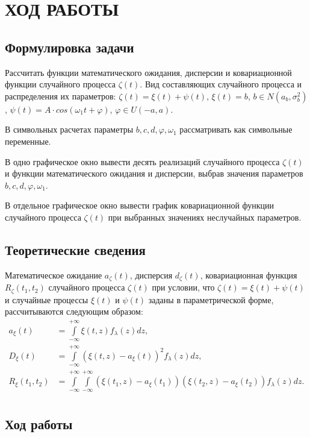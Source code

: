 \section{ХОД РАБОТЫ}

\subsection{Формулировка задачи}

Рассчитать функции математического ожидания, дисперсии и ковариационной функции
случайного процесса $ \zeta(t) $. Вид составляющих случайного процесса
и распределения их параметров:
$ \zeta(t)= \xi(t) + \psi(t) $,
$ \xi(t) = b $,
$ b \in N(a_b, \sigma^2_b) $,
$ \psi(t) = A \cdot cos(\omega_1 t + \varphi) $,
$ \varphi \in U(-a,a)$.

В символьных расчетах параметры $ b, c, d,
\varphi, \omega_1 $ рассматривать как символьные переменные.

В одно графическое окно вывести десять реализаций случайного процесса $ \zeta(t) $
и функции математического ожидания и дисперсии, выбрав значения
параметров $ b, c, d, \varphi, \omega_1 $.

В отдельное графическое окно вывести график ковариационной функции
случайного процесса $ \zeta(t) $ при выбранных значениях неслучайных параметров.


\subsection{Теоретические сведения}

Математическое ожидание $ a_{\zeta} (t) $, дисперсия $ d_{\zeta} (t) $,
ковариационная функция $ R_{\zeta} (t_1, t_2) $ случайного процесса $ \zeta(t) $
при условии, что $ \zeta(t) = \xi(t) + \psi(t) $ и случайные процессы $ \xi(t) $
и $ \psi(t) $ заданы в параметрической форме, рассчитываются
следующим образом:
\begin{align*}
  a_{\xi}(t) &= \int\limits_{-\infty}^{+\infty}  \xi(t, z) f_{\lambda}(z) dz, \\ 
  D_{\xi}(t) &= \int\limits_{-\infty}^{+\infty} (\xi(t, z) - a_{\xi}(t))^2 f_{\lambda}(z) dz, \\
  R_{\xi}(t_1, t_2) &= \int\limits_{-\infty}^{+\infty} \int\limits_{-\infty}^{+\infty} (\xi(t_1, z) - a_{\xi}(t_1)) (\xi(t_2, z) - a_{\xi}(t_2)) f_{\lambda}(z) dz. \\
\end{align*}


\pagebreak
\subsection{Ход работы}

